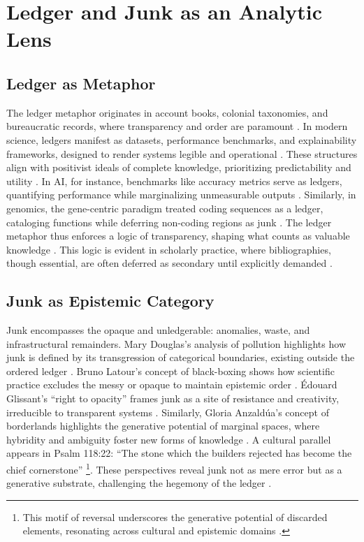 \documentclass[11pt]{article}
\begin{document}
\section{Ledger and Junk as an Analytic Lens}

\subsection{Ledger as Metaphor}
The ledger metaphor originates in account books, colonial taxonomies, and bureaucratic records, where transparency and order are paramount \citep{poovey1998}. In modern science, ledgers manifest as datasets, performance benchmarks, and explainability frameworks, designed to render systems legible and operational \citep{gitelman2013}. These structures align with positivist ideals of complete knowledge, prioritizing predictability and utility \citep{hacking1983}. In AI, for instance, benchmarks like accuracy metrics serve as ledgers, quantifying performance while marginalizing unmeasurable outputs \citep{bowker2005}. Similarly, in genomics, the gene-centric paradigm treated coding sequences as a ledger, cataloging functions while deferring non-coding regions as junk \citep{keller2000}. The ledger metaphor thus enforces a logic of transparency, shaping what counts as valuable knowledge \citep{scott1998}. This logic is evident in scholarly practice, where bibliographies, though essential, are often deferred as secondary until explicitly demanded \citep{rheinberger1997, star1989}.

\subsection{Junk as Epistemic Category}
Junk encompasses the opaque and unledgerable: anomalies, waste, and infrastructural remainders. Mary Douglas’s analysis of pollution highlights how junk is defined by its transgression of categorical boundaries, existing outside the ordered ledger \citep{douglas1966}. Bruno Latour’s concept of black-boxing shows how scientific practice excludes the messy or opaque to maintain epistemic order \citep{latour1987}. Édouard Glissant’s ``right to opacity'' frames junk as a site of resistance and creativity, irreducible to transparent systems \citep{glissant1997}. Similarly, Gloria Anzaldúa’s concept of borderlands highlights the generative potential of marginal spaces, where hybridity and ambiguity foster new forms of knowledge \citep{anzadua1987}. A cultural parallel appears in Psalm 118:22: ``The stone which the builders rejected has become the chief cornerstone'' \footnote{This motif of reversal underscores the generative potential of discarded elements, resonating across cultural and epistemic domains \citep{douglas1966, latour1987, glissant1997, anzadua1987}.}. These perspectives reveal junk not as mere error but as a generative substrate, challenging the hegemony of the ledger \citep{barad2007, bachelard1984}.
\end{document}
